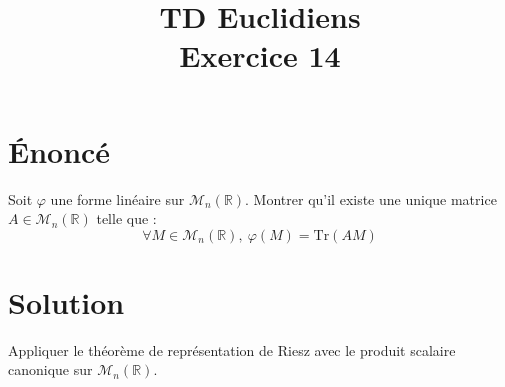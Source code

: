 \documentclass[french]{article}
\title{TD Euclidiens\\ Exercice 14}
\date{}
\newcommand{\R}{\mathbb{R}}
\newcommand{\Tr}{\text{Tr}}
\begin{document}
\maketitle

\section{Énoncé}
Soit $\varphi$ une forme linéaire sur $\mathcal{M}_n(\R)$. Montrer qu'il existe une unique matrice $A\in\mathcal{M}_n(\R)$ telle que : $$\forall M\in\mathcal{M}_n(\R),\ \varphi(M)=\Tr(AM)$$

\section{Solution}
Appliquer le théorème de représentation de Riesz avec le produit scalaire canonique sur $\mathcal{M}_n(\R)$.
\end{document}
